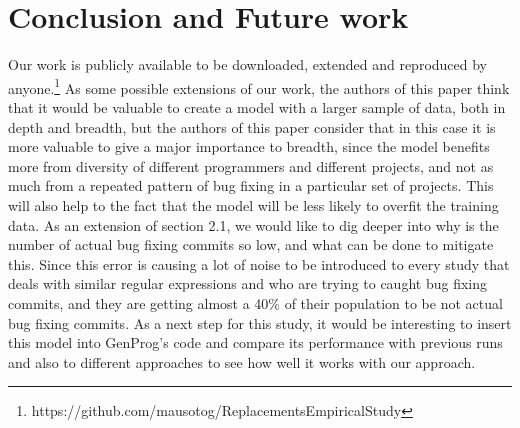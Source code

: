 
\section{Conclusion and Future work}
Our work is publicly available to be downloaded, extended and reproduced by anyone.\footnote{https://github.com/mausotog/ReplacementsEmpiricalStudy}
As some possible extensions of our work, the authors of this paper think that it would be valuable to create a model with a larger sample of data, both in depth and breadth, but the authors of this paper consider that in this case it is more valuable to give a major importance to breadth, since the model benefits more from diversity of different programmers and different projects, and not as much from a repeated pattern of bug fixing in a particular set of projects. This will also help to the fact that the model will be less likely to overfit the training data.
As an extension of section 2.1, we would like to dig deeper into why is the number of actual bug fixing commits so low, and what can be done to mitigate this. Since this error is causing a lot of noise to be introduced to every study that deals with similar regular expressions and who are trying to caught bug fixing commits, and they are getting almost a 40\% of their population to be not actual bug fixing commits.
As a next step for this study, it would be interesting to insert this model into GenProg's code and compare its performance with previous runs and also to different approaches to see how well it works with our approach.
